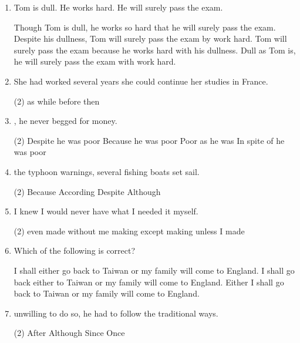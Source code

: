 \begin{enumerate}
\item Tom is dull. He works hard. He will surely pass the exam.
\begin{tasks}
  \task Though Tom is dull, he works so hard that he will surely pass the exam.
  \task Despite his dullness, Tom will surely pass the exam by work hard.
  \task Tom will surely pass the exam because he works hard with his dullness.
  \task Dull as Tom is, he will surely pass the exam with work hard.
\end{tasks}

\item She had worked several years \ttu she could continue her studies in France.
\begin{tasks}(2)
  \task as
  \task while
  \task before
  \task then
\end{tasks}

\item \ttu, he never begged for money.
\begin{tasks}(2)
  \task Despite he was poor
  \task Because he was poor
  \task Poor as he was
  \task In spite of he was poor
\end{tasks}

\item \ttu the typhoon warnings, several fishing boats set sail.
\begin{tasks}(2)
  \task Because
  \task According
  \task Despite
  \task Although
\end{tasks}

\item I knew I would never have what I needed \ttu it myself.
\begin{tasks}(2)
  \task even made
  \task without me making
  \task except making
  \task unless I made
\end{tasks}

\item Which of the following is correct?
\begin{tasks}
  \task I shall either go back to Taiwan or my family will come to England.
  \task I shall go back either to Taiwan or my family will come to England.
  \task Either I shall go back to Taiwan or my family will come to England.
\end{tasks}

\item \ttu unwilling to do so, he had to follow the traditional ways.
\begin{tasks}(2)
  \task After
  \task Although
  \task Since
  \task Once
\end{tasks}


\end{enumerate}
